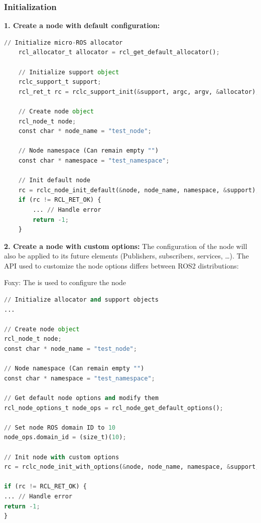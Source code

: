 \subsubsection{Initialization}
\textbf{1. Create a node with default configuration:}
\begin{lstlisting}[language=Python, caption=Python example]
    // Initialize micro-ROS allocator
    rcl_allocator_t allocator = rcl_get_default_allocator();
    
    // Initialize support object
    rclc_support_t support;
    rcl_ret_t rc = rclc_support_init(&support, argc, argv, &allocator);
    
    // Create node object
    rcl_node_t node;
    const char * node_name = "test_node";
    
    // Node namespace (Can remain empty "")
    const char * namespace = "test_namespace";
    
    // Init default node
    rc = rclc_node_init_default(&node, node_name, namespace, &support);
    if (rc != RCL_RET_OK) {
        ... // Handle error
        return -1;
    }
\end{lstlisting}

\textbf{2. Create a node with custom options:} The configuration of the node will also be applied to its future elements (Publishers, subscribers, services, \dots). The API used to customize the node options differs between ROS2 distributions:

Foxy: The  is used to configure the node
\begin{lstlisting}[language=Python, caption=Python example]
// Initialize allocator and support objects
...

// Create node object
rcl_node_t node;
const char * node_name = "test_node";

// Node namespace (Can remain empty "")
const char * namespace = "test_namespace";

// Get default node options and modify them
rcl_node_options_t node_ops = rcl_node_get_default_options();

// Set node ROS domain ID to 10
node_ops.domain_id = (size_t)(10);

// Init node with custom options
rc = rclc_node_init_with_options(&node, node_name, namespace, &support, &node_ops);

if (rc != RCL_RET_OK) {
... // Handle error
return -1;
}
\end{lstlisting}

